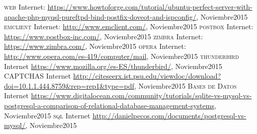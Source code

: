 \documentclass[12pt,oneside,onecolumn,openany]{report}
\begin{document}
\begin{thebibliography}{a}
   \textsc{web} Internet: \url{https://www.howtoforge.com/tutorial/ubuntu-perfect-server-with-apache-php-myqsl-pureftpd-bind-postfix-doveot-and-ispconfig/}, Noviembre2015
   \textsc{emclient} Internet: \url{http://www.emclient.com/}, Noviembre2015
   \textsc{postbox} Internet: \url{https://www.postbox-inc.com/}, Noviembre2015
   \textsc{zimbra} Internet: \url{https://www.zimbra.com/}, Noviembre2015
   \textsc{opera} Internet: \url{http://www.opera.com/es-419/computer/mail}, Noviembre2015
   \textsc{thunderbird} Internet \url{https://www.mozilla.org/es-ES/thunderbird/}, Noviembre2015
   \textsc{CAPTCHAS} Internet \url{http://citeseerx.ist.psu.edu/viewdoc/download?doi=10.1.1.444.8759&rep=rep1&type=pdf}, Noviembre2015
   \textsc{Bases de Datos} Internet \url{https://www.digitalocean.com/community/tutorials/sqlite-vs-mysql-vs-postgresql-a-comparison-of-relational-database-management-systems}, Noviembre2015
   \textsc{sql} Internet \url{http://danielpecos.com/documents/postgresql-vs-mysql/}, Noviembre2015
\end{thebibliography}


 
 
\end{document}
